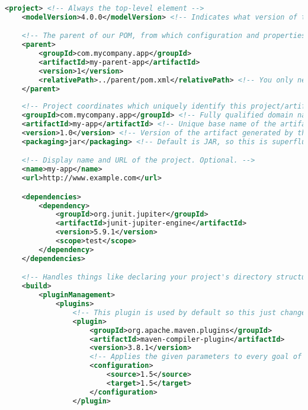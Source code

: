 \documentclass[8pt, table, xcdraw]{article}%
\begin{document}
\begin{lstlisting}[language=XML]
<project> <!-- Always the top-level element -->
    <modelVersion>4.0.0</modelVersion> <!-- Indicates what version of the object model this POM is using. Changes very infrequently, but it is mandatory. Is always 4.0.0 for Maven 2.x POMs -->

    <!-- The parent of our POM, from which configuration and properties are inherited -->
    <parent>
        <groupId>com.mycompany.app</groupId>
        <artifactId>my-parent-app</artifactId>
        <version>1</version>
        <relativePath>../parent/pom.xml</relativePath> <!-- You only need to specify this if the parent POM is not in the parent directory -->
    </parent>
  
    <!-- Project coordinates which uniquely identify this project/artifact -->
    <groupId>com.mycompany.app</groupId> <!-- Fully qualified domain name of the organization. You can omit this if you want to inherit -->
    <artifactId>my-app</artifactId> <!-- Unique base name of the artifact being generated by this project (typically a JAR) -->
    <version>1.0</version> <!-- Version of the artifact generated by the project. You can omit this if you want to inherit -->
    <packaging>jar</packaging> <!-- Default is JAR, so this is superfluous. Different options bind different goals to phases -->

    <!-- Display name and URL of the project. Optional. -->
    <name>my-app</name>
    <url>http://www.example.com</url>

    <dependencies>
        <dependency>
            <groupId>org.junit.jupiter</groupId>
            <artifactId>junit-jupiter-engine</artifactId>
            <version>5.9.1</version>
            <scope>test</scope>
        </dependency>
    </dependencies>

    <!-- Handles things like declaring your project's directory structure and managing plugins -->
    <build>
        <pluginManagement>
            <plugins>
                <!-- This plugin is used by default so this just changes the configuration -->
                <plugin>
                    <groupId>org.apache.maven.plugins</groupId>
                    <artifactId>maven-compiler-plugin</artifactId>
                    <version>3.8.1</version>
                    <!-- Applies the given parameters to every goal of this plugin -->
                    <configuration>
                        <source>1.5</source>
                        <target>1.5</target>
                    </configuration>
                </plugin>


\end{lstlisting}
\end{document}
